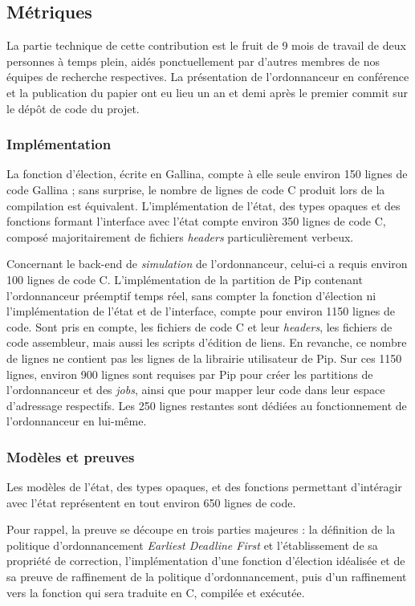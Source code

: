 		\subsection{Métriques}

		La partie technique de cette contribution est le fruit de 9 mois de travail de deux personnes à temps plein, aidés ponctuellement par d'autres membres de nos équipes de recherche respectives. La présentation de l'ordonnanceur en conférence et la publication du papier ont eu lieu un an et demi après le premier commit sur le dépôt de code du projet.

			\subsubsection{Implémentation}
			La fonction d'élection, écrite en Gallina, compte à elle seule environ 150 lignes de code Gallina ; sans surprise, le nombre de lignes de code C produit lors de la compilation est équivalent. L'implémentation de l'état, des types opaques et des fonctions formant l'interface avec l'état compte environ 350 lignes de code C, composé majoritairement de fichiers \emph{headers} particulièrement verbeux.

			Concernant le back-end de \emph{simulation} de l'ordonnanceur, celui-ci a requis environ 100 lignes de code C. L'implémentation de la partition de Pip contenant l'ordonnanceur préemptif temps réel, sans compter la fonction d'élection ni l'implémentation de l'état et de l'interface, compte pour environ 1150 lignes de code. Sont pris en compte, les fichiers de code C et leur \emph{headers}, les fichiers de code assembleur, mais aussi les scripts d'édition de liens. En revanche, ce nombre de lignes ne contient pas les lignes de la librairie utilisateur de Pip. Sur ces 1150 lignes, environ 900 lignes sont requises par Pip pour créer les partitions de l'ordonnanceur et des \emph{jobs}, ainsi que pour mapper leur code dans leur espace d'adressage respectifs. Les 250 lignes restantes sont dédiées au fonctionnement de l'ordonnanceur en lui-même.

			\subsubsection{Modèles et preuves}
			
			Les modèles de l'état, des types opaques, et des fonctions permettant d'intéragir avec l'état représentent en tout environ 650 lignes de code.

			Pour rappel, la preuve se découpe en trois parties majeures : la définition de la politique d'ordonnancement \emph{Earliest Deadline First} et l'établissement de sa propriété de correction, l'implémentation d'une fonction d'élection idéalisée et de sa preuve de raffinement de la politique d'ordonnancement, puis d'un raffinement vers la fonction qui sera traduite en C, compilée et exécutée.

